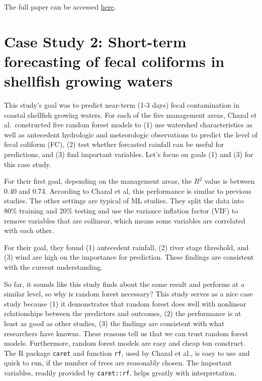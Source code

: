 \documentclass[
]{book}
\begin{document}
The full paper can be accessed \href{https://www.sciencedirect.com/science/article/pii/S1364815223001445?dgcid=author}{here}.

\hypertarget{case-study-2-short-term-forecasting-of-fecal-coliforms-in-shellfish-growing-waters}{%
\section{Case Study 2: Short-term forecasting of fecal coliforms in shellfish growing waters}\label{case-study-2-short-term-forecasting-of-fecal-coliforms-in-shellfish-growing-waters}}

This study's goal was to predict near-term (1-3 days) fecal contamination in coastal shellfish growing waters. For each of the five management areas, Chazal et al.~constructed five random forest models to (1) use watershed characteristics as well as antecedent hydrologic and meteorologic observations to predict the level of fecal coliform (FC), (2) test whether forcasted rainfall can be useful for predictions, and (3) find important variables. Let's focus on goals (1) and (3) for this case study.

For their first goal, depending on the management areas, the \(R^2\) value is between 0.40 and 0.74. According to Chazal et al, this performance is similar to previous studies. The other settings are typical of ML studies. They split the data into 80\% training and 20\% testing and use the variance inflation factor (VIF) to remove variables that are collinear, which means some variables are correlated with each other.

For their goal, they found (1) antecedent rainfall, (2) river stage threshold, and (3) wind are high on the importance for prediction. These findings are consistent with the current understanding.

So far, it sounds like this study finds about the same result and performs at a similar level, so why is random forest necessary? This study serves as a nice case study because (1) it demonstrates that random forest does well with nonlinear relationships between the predictors and outcomes, (2) the performance is at least as good as other studies, (3) the findings are consistent with what researchers have knowns. These reasons tell us that we can trust random forest models. Furthermore, random forest models are easy and cheap ton construct. The R package \texttt{caret} and function \texttt{rf}, used by Chazal et al., is easy to use and quick to run, if the number of trees are reasonably chosen. The important variables, readily provided by \texttt{caret::rf}, helps greatly with interpretation.
\end{document}
